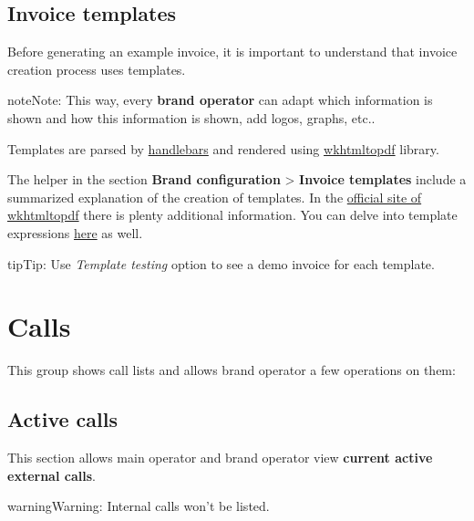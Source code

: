\documentclass[letterpaper,10pt,english]{sphinxmanual}
\begin{document}
\subsection{Invoice templates}
\label{administration_portal/brand/invoicing/invoice_templates::doc}\label{administration_portal/brand/invoicing/invoice_templates:invoice-templates}
Before generating an example invoice, it is important to understand that invoice
creation process uses templates.

\begin{notice}{note}{Note:}
This way, every \textbf{brand operator} can adapt which information
is shown and how this information is shown, add logos, graphs, etc..
\end{notice}

Templates are parsed by \href{https://github.com/XaminProject/handlebars.php}{handlebars} and rendered
using \href{https://wkhtmltopdf.org/}{wkhtmltopdf} library.

The helper in the section \textbf{Brand configuration} \textgreater{} \textbf{Invoice templates} include
a summarized explanation of the creation of templates. In the \href{https://wkhtmltopdf.org/usage/wkhtmltopdf.txt}{official site of wkhtmltopdf} there is plenty additional information.
You can delve into template expressions \href{http://handlebarsjs.com/expressions.html}{here} as well.

\begin{notice}{tip}{Tip:}
Use \emph{Template testing} option to see a demo invoice for each template.
\end{notice}


\section{Calls}
\label{administration_portal/brand/calls/index::doc}\label{administration_portal/brand/calls/index:calls}
This group shows call lists and allows brand operator a few operations on them:


\subsection{Active calls}
\label{administration_portal/brand/calls/active_calls::doc}\label{administration_portal/brand/calls/active_calls:active-calls}
This section allows main operator and brand operator view \textbf{current active external calls}.

\begin{notice}{warning}{Warning:}
Internal calls won't be listed.
\end{notice}
\end{document}
